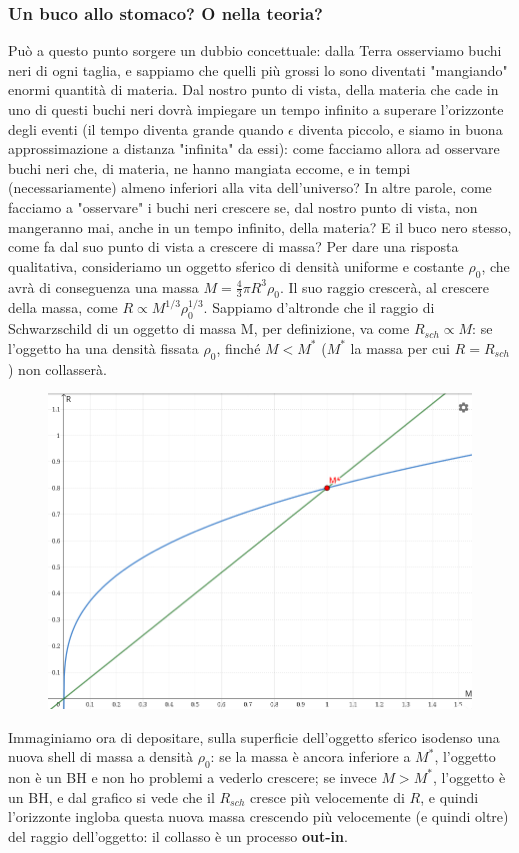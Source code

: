 \subsubsection{Un buco allo stomaco? O nella teoria?}
Può a questo punto sorgere un dubbio concettuale: dalla Terra osserviamo buchi neri di ogni taglia, e sappiamo che quelli più grossi lo sono diventati "mangiando" enormi quantità di materia.
Dal nostro punto di vista, della materia che cade in uno di questi buchi neri dovrà impiegare un tempo infinito a superare l'orizzonte degli eventi (il tempo diventa grande quando $\epsilon $ diventa piccolo, e siamo in buona approssimazione a distanza "infinita" da essi): come facciamo allora ad osservare buchi neri che, di materia, ne hanno mangiata eccome, e in tempi (necessariamente) almeno inferiori alla vita dell'universo?
In altre parole, come facciamo a "osservare" i buchi neri crescere se, dal nostro punto di vista, non mangeranno mai, anche in un tempo infinito, della materia? E il buco nero stesso, come fa dal suo punto di vista a crescere di massa?
Per dare una risposta qualitativa, consideriamo un oggetto sferico di densità uniforme e costante $\rho_0 $, che avrà di conseguenza una massa $M = \frac{4}{3}\pi R^3 \rho_0$. Il suo raggio crescerà, al crescere della massa, come $R\propto M^{1/3}\rho_0^{1/3} $. 
Sappiamo d'altronde che il raggio di Schwarzschild di un oggetto di massa M, per definizione, va come $R_{sch} \propto M $: se l'oggetto ha una densità fissata $\rho_0$, finché $M<M^*$ ($M^*$ la massa per cui $R=R_{sch}$) non collasserà.\\
\begin{figure}[h!]
    \centering
    \includegraphics[width=0.7\linewidth]{Immagini/collasso_out_in_grafico.png}
    \label{fig:enter-label}
\end{figure}

Immaginiamo ora di depositare, sulla superficie dell'oggetto sferico isodenso una nuova shell di massa a densità $\rho_0$:
se la massa è ancora inferiore a $M^*$, l'oggetto non è un BH e non ho problemi a vederlo crescere; se invece $M>M^*$, l'oggetto è un BH, e dal grafico si vede che il $R_{sch}$ cresce più velocemente di $R$, e quindi l'orizzonte ingloba questa nuova massa crescendo più velocemente (e quindi oltre) del raggio dell'oggetto: il collasso è un processo \textbf{out-in}.

